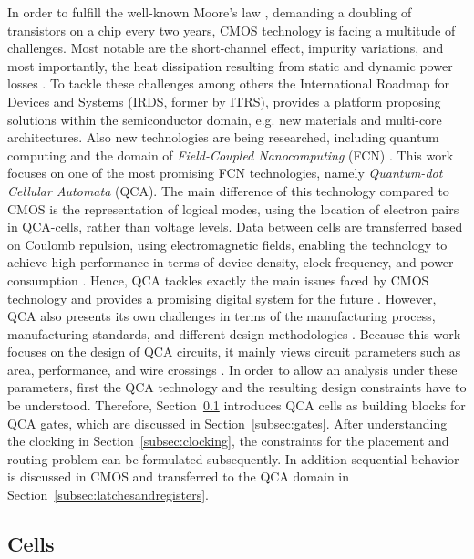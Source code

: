 In order to fulfill the well-known Moore's law \cite{Moores_Law}, demanding a doubling of transistors on a chip every two years, CMOS technology is facing a multitude of challenges. Most notable are the short-channel effect, impurity variations, and most importantly, the heat dissipation resulting from static and dynamic power losses \cite{challenges_1, challenges_2, challenges_3}. To tackle these challenges among others the International Roadmap for Devices and Systems (IRDS, former by ITRS), provides a platform proposing solutions within the semiconductor domain, e.g. new materials and multi-core architectures. Also new technologies are being researched, including quantum computing and the domain of \textit{Field-Coupled Nanocomputing} (FCN) \cite{safoev2020design}. This work focuses on one of the most promising FCN technologies, namely \textit{Quantum-dot Cellular Automata} (QCA). The main difference of this technology compared to CMOS is the representation of logical modes, using the location of electron pairs in QCA-cells, rather than voltage levels. Data between cells are transferred based on Coulomb repulsion, using electromagnetic fields, enabling the technology to achieve high performance in terms of device density, clock frequency, and power consumption \cite{mohammadi2016efficient}. Hence, QCA tackles exactly the main issues faced by CMOS technology and provides a promising digital system for the future \cite{ahmad2018optimal}. However, QCA also presents its own challenges in terms of the manufacturing process, manufacturing standards, and different design
methodologies \cite{Bennet_waveform}. Because this work focuses on the design of QCA circuits, it mainly views circuit parameters such as area, performance, and wire crossings \cite{ahmad2018optimal}. In order to allow an analysis under these parameters, first the QCA technology and the resulting design constraints have to be understood. Therefore, Section~\ref{subsec:cells} introduces QCA cells as building blocks for QCA gates, which are discussed in Section~\ref{subsec:gates}. After understanding the clocking in Section~\ref{subsec:clocking}, the constraints for the placement and routing problem can be formulated subsequently. In addition sequential behavior is discussed in CMOS and transferred to the QCA domain in Section~\ref{subsec:latchesandregisters}.

\subsection{Cells}\label{subsec:cells}


